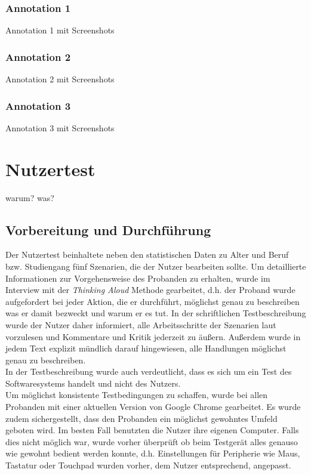 \subsubsection{Annotation 1}
Annotation 1 mit Screenshots

\subsubsection{Annotation 2}
Annotation 2 mit Screenshots

\subsubsection{Annotation 3}
Annotation 3 mit Screenshots


\section{Nutzertest}

warum? was?

\subsection{Vorbereitung und Durchführung}

Der Nutzertest beinhaltete neben den statistischen Daten zu Alter und Beruf bzw. Studiengang fünf Szenarien, die der Nutzer bearbeiten sollte. Um detaillierte Informationen zur Vorgehensweise des Probanden zu erhalten, wurde im Interview mit der \textit{Thinking Aloud} Methode gearbeitet, d.h. der Proband wurde aufgefordert bei jeder Aktion, die er durchführt, möglichst genau zu beschreiben was er damit bezweckt und warum er es tut.  In der schriftlichen Testbeschreibung wurde der Nutzer daher informiert, alle Arbeitsschritte der Szenarien laut vorzulesen und Kommentare und Kritik jederzeit zu äußern. Außerdem wurde in jedem Text explizit mündlich darauf hingewiesen, alle Handlungen möglichst genau zu beschreiben.\\
In der Testbeschreibung wurde auch verdeutlicht, dass es sich um ein Test des Softwaresystems handelt und nicht des Nutzers. \\

Um möglichst konsistente Testbedingungen zu schaffen, wurde bei allen Probanden mit einer aktuellen Version von Google Chrome gearbeitet. Es wurde zudem sichergestellt, dass den Probanden ein möglichst gewohntes Umfeld geboten wird. Im besten Fall benutzten die Nutzer ihre eigenen Computer. Falls dies nicht möglich war, wurde vorher überprüft ob beim Testgerät alles genauso wie gewohnt bedient werden konnte, d.h. Einstellungen für Peripherie wie Maus, Tastatur oder Touchpad wurden vorher, dem Nutzer entsprechend, angepasst.\\

